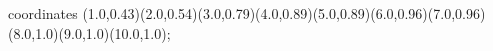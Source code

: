 					coordinates { (1.0,0.43)(2.0,0.54)(3.0,0.79)(4.0,0.89)(5.0,0.89)(6.0,0.96)(7.0,0.96)(8.0,1.0)(9.0,1.0)(10.0,1.0)};